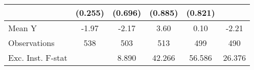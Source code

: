 {\begin{tabular}{l*{5}{c}}
            &     (0.255)         &     (0.696)         &     (0.885)         &     (0.821)         &                     \\
\midrule
Mean Y      &       -1.97         &       -2.17         &        3.60         &        0.10         &       -2.21         \\
Observations&         538         &         503         &         513         &         499         &         490         \\
Exc. Inst. F-stat&                     &       8.890         &      42.266         &      56.586         &      26.376         \\
\bottomrule
\end{tabular}
}
